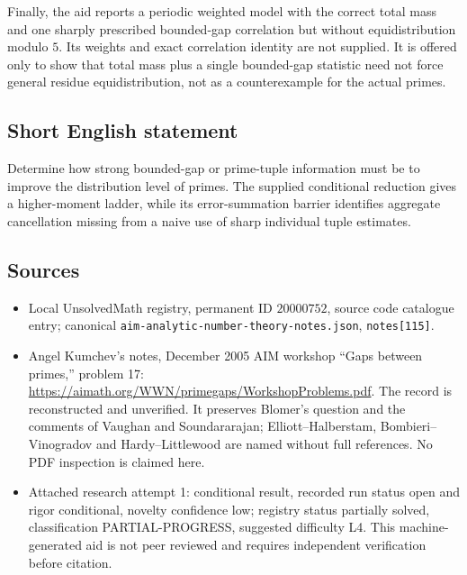 \documentclass[11pt]{article}
\begin{document}
Finally, the aid reports a periodic weighted model with the correct total mass and one sharply prescribed bounded-gap correlation but without equidistribution modulo $5$. Its weights and exact correlation identity are not supplied. It is offered only to show that total mass plus a single bounded-gap statistic need not force general residue equidistribution, not as a counterexample for the actual primes.
\subsection{Short English statement}
Determine how strong bounded-gap or prime-tuple information must be to improve the distribution level of primes. The supplied conditional reduction gives a higher-moment ladder, while its error-summation barrier identifies aggregate cancellation missing from a naive use of sharp individual tuple estimates.
\subsection{Sources}
\begin{itemize}
\item Local UnsolvedMath registry, permanent ID $20000752$, source code catalogue entry; canonical \texttt{aim-analytic-number-theory-notes.json}, \texttt{notes[115]}.
\item Angel Kumchev's notes, December 2005 AIM workshop ``Gaps between primes,'' problem 17: \url{https://aimath.org/WWN/primegaps/WorkshopProblems.pdf}. The record is reconstructed and unverified. It preserves Blomer's question and the comments of Vaughan and Soundararajan; Elliott--Halberstam, Bombieri--Vinogradov and Hardy--Littlewood are named without full references. No PDF inspection is claimed here.
\item Attached research attempt 1: conditional result, recorded run status open and rigor conditional, novelty confidence low; registry status partially solved, classification PARTIAL-PROGRESS, suggested difficulty L4. This machine-generated aid is not peer reviewed and requires independent verification before citation.
\end{itemize}
\end{document}
